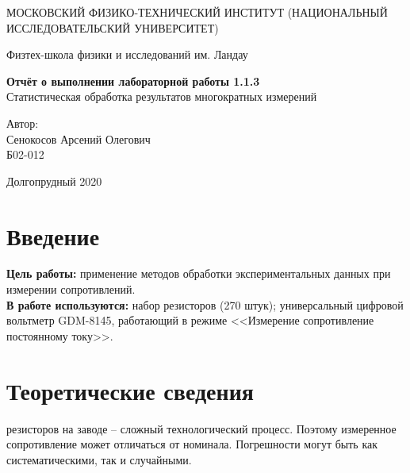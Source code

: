 \documentclass[a4paper,12pt]{article} %
\date{\today}
\begin{document}
\begin{titlepage}
	\begin{center}
		{\large МОСКОВСКИЙ ФИЗИКО-ТЕХНИЧЕСКИЙ ИНСТИТУТ (НАЦИОНАЛЬНЫЙ ИССЛЕДОВАТЕЛЬСКИЙ УНИВЕРСИТЕТ)}
	\end{center}
	\begin{center}
		{\large Физтех-школа физики и исследований им. Ландау}
	\end{center}
	
	
	\vspace{4.5cm}
	{\huge
		\begin{center}
			{\bf Отчёт о выполнении лабораторной работы 1.1.3}\\
			Статистическая обработка результатов многократных измерений
		\end{center}
	}
	\vspace{2cm}
	\begin{flushright}
		{\LARGE Автор:\\ Сенокосов Арсений Олегович \\
			\vspace{0.2cm}
			Б02-012}
	\end{flushright}
	\vspace{8cm}
	\begin{center}
		Долгопрудный 2020
	\end{center}
\end{titlepage}

\section{Введение}

\textbf{Цель работы:} применение методов обработки экспериментальных данных при измерении сопротивлений.\\

\noindent\textbf{В работе используются:} набор резисторов (270 штук); универсальный цифровой вольтметр GDM-8145, работающий в режиме <<Измерение сопротивление постоянному току>>.

\section{Теоретические сведения}

 резисторов на заводе -- сложный технологический процесс. Поэтому измеренное сопротивление может отличаться от номинала. Погрешности могут быть как систематическими, так и случайными.

\medskip
\end{document}
